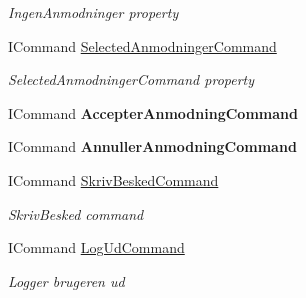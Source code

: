 \begin{DoxyCompactItemize}
\begin{DoxyCompactList}\small\item\em Ingen\+Anmodninger property \end{DoxyCompactList}\item 
I\+Command \hyperlink{class__1aarsproeve_1_1_view_model_1_1_hoved_view_model_a7f36282e82a32f8ea520ec676e53bcae}{Selected\+Anmodninger\+Command}
\begin{DoxyCompactList}\small\item\em Selected\+Anmodninger\+Command property \end{DoxyCompactList}\item 
\hypertarget{class__1aarsproeve_1_1_view_model_1_1_hoved_view_model_a0dcfb8149e0a57bfa65b3466857ee907}{}I\+Command {\bfseries Accepter\+Anmodning\+Command}\label{class__1aarsproeve_1_1_view_model_1_1_hoved_view_model_a0dcfb8149e0a57bfa65b3466857ee907}

\item 
\hypertarget{class__1aarsproeve_1_1_view_model_1_1_hoved_view_model_aa3f28de12b1a14db3659b56a5797d724}{}I\+Command {\bfseries Annuller\+Anmodning\+Command}\label{class__1aarsproeve_1_1_view_model_1_1_hoved_view_model_aa3f28de12b1a14db3659b56a5797d724}

\item 
I\+Command \hyperlink{class__1aarsproeve_1_1_view_model_1_1_hoved_view_model_a72688ca49a29be5fc3fa18d16449387e}{Skriv\+Besked\+Command}
\begin{DoxyCompactList}\small\item\em Skriv\+Besked command \end{DoxyCompactList}\item 
I\+Command \hyperlink{class__1aarsproeve_1_1_view_model_1_1_hoved_view_model_ae541527e8e9063cc3337b229b93c7e48}{Log\+Ud\+Command}
\begin{DoxyCompactList}\small\item\em Logger brugeren ud \end{DoxyCompactList}\end{DoxyCompactItemize}


